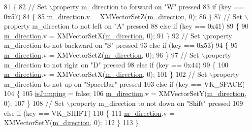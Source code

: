 \begin{DoxyCode}
81 \{
82     \textcolor{comment}{// Set \(\backslash\)property m\_direction to forward on "W" pressed}
83     \textcolor{keywordflow}{if} (key == 0x57)
84     \{
85         \mbox{\hyperlink{class_camera_helper_af2822e6b05e48f33100c2f678e3776ce}{m\_direction}}.v = XMVectorSetZ(\mbox{\hyperlink{class_camera_helper_af2822e6b05e48f33100c2f678e3776ce}{m\_direction}}, 0);
86     \}
87     \textcolor{comment}{// Set \(\backslash\)property m\_direction to not left on "A" pressed}
88     \textcolor{keywordflow}{else} \textcolor{keywordflow}{if} (key == 0x41)
89     \{
90         \mbox{\hyperlink{class_camera_helper_af2822e6b05e48f33100c2f678e3776ce}{m\_direction}}.v = XMVectorSetX(\mbox{\hyperlink{class_camera_helper_af2822e6b05e48f33100c2f678e3776ce}{m\_direction}}, 0);
91     \}
92     \textcolor{comment}{// Set \(\backslash\)property m\_direction to not backward on "S" pressed}
93     \textcolor{keywordflow}{else} \textcolor{keywordflow}{if} (key == 0x53)
94     \{
95         \mbox{\hyperlink{class_camera_helper_af2822e6b05e48f33100c2f678e3776ce}{m\_direction}}.v = XMVectorSetZ(\mbox{\hyperlink{class_camera_helper_af2822e6b05e48f33100c2f678e3776ce}{m\_direction}}, 0);
96     \}
97     \textcolor{comment}{// Set \(\backslash\)property m\_direction to not right on "D" pressed}
98     \textcolor{keywordflow}{else} \textcolor{keywordflow}{if} (key == 0x44)
99     \{
100         \mbox{\hyperlink{class_camera_helper_af2822e6b05e48f33100c2f678e3776ce}{m\_direction}}.v = XMVectorSetX(\mbox{\hyperlink{class_camera_helper_af2822e6b05e48f33100c2f678e3776ce}{m\_direction}}, 0);
101     \}
102     \textcolor{comment}{// Set \(\backslash\)property m\_direction to not up on "SpaceBar" pressed}
103     \textcolor{keywordflow}{else} \textcolor{keywordflow}{if} (key == VK\_SPACE)
104     \{
105         \mbox{\hyperlink{class_camera_helper_ac0dd816f2a5e8b4030b62e703ab92861}{isJumping}} = \textcolor{keyword}{false};
106         \mbox{\hyperlink{class_camera_helper_af2822e6b05e48f33100c2f678e3776ce}{m\_direction}}.v = XMVectorSetY(\mbox{\hyperlink{class_camera_helper_af2822e6b05e48f33100c2f678e3776ce}{m\_direction}}, 0);
107     \}
108     \textcolor{comment}{// Set \(\backslash\)property m\_direction to not down on "Shift" pressed}
109     \textcolor{keywordflow}{else} \textcolor{keywordflow}{if} (key == VK\_SHIFT)
110     \{
111         \mbox{\hyperlink{class_camera_helper_af2822e6b05e48f33100c2f678e3776ce}{m\_direction}}.v = XMVectorSetY(\mbox{\hyperlink{class_camera_helper_af2822e6b05e48f33100c2f678e3776ce}{m\_direction}}, 0);
112     \}
113 \}
\end{DoxyCode}
\mbox{\label{class_camera_helper_add97d2d08199687ac37111773001bb10}} 
